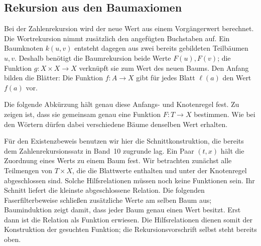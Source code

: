 \subsection{Rekursion aus den Baumaxiomen}

Bei der Zahlenrekursion wird der neue Wert aus einem Vorgängerwert
berechnet. Die Wortrekursion nimmt zusätzlich den angefügten Buchstaben
auf. Ein Baumknoten \(k(u,v)\) entsteht dagegen aus zwei bereits
gebildeten Teilbäumen \(u,v\). Deshalb benötigt die Baumrekursion
beide Werte \(F(u),F(v)\); die Funktion \(g\colon X\times X\to X\)
verknüpft sie zum Wert des neuen Baums. Den Anfang bilden die Blätter:
Die Funktion \(f\colon A\to X\) gibt für jedes Blatt \(\ell(a)\)
den Wert \(f(a)\) vor.

Die folgende Abkürzung hält genau diese Anfangs- und Knotenregel fest.
Zu zeigen ist, dass sie gemeinsam genau eine Funktion \(F\colon T\to X\)
bestimmen. Wie bei den Wörtern dürfen dabei verschiedene Bäume denselben
Wert erhalten.



Für den Existenzbeweis benutzen wir hier die Schnittkonstruktion,
die bereits dem Zahlenrekursionssatz in Band~10 zugrunde lag.
Ein Paar \((t,x)\) hält die Zuordnung eines Werts zu einem Baum fest.
Wir betrachten zunächst alle Teilmengen von \(T\times X\), die die
Blattwerte enthalten und unter der Knotenregel abgeschlossen sind.
Solche Hilfsrelationen müssen noch keine Funktionen sein. Ihr Schnitt
liefert die kleinste abgeschlossene Relation. Die folgenden
Faserfilterbeweise schließen zusätzliche Werte am selben Baum aus;
Bauminduktion zeigt damit, dass jeder Baum genau einen Wert besitzt.
Erst dann ist die Relation als Funktion erwiesen. Die Hilfsrelationen
dienen somit der Konstruktion der gesuchten Funktion; die
Rekursionsvorschrift selbst steht bereits oben.

\noindent\begin{minipage}{\linewidth}
\end{minipage}\par

